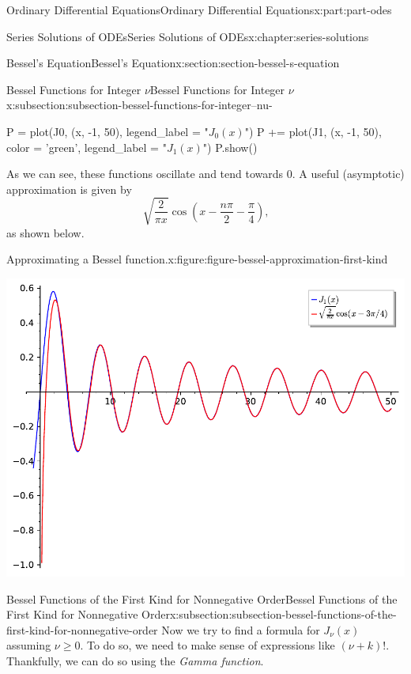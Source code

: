 \documentclass[oneside,10pt,]{book}
\numberwithin{equation}{part}
\begin{document}
\begin{partptx}{Ordinary Differential Equations}{}{Ordinary Differential Equations}{}{}{x:part:part-odes}
\begin{chapterptx}{Series Solutions of ODEs}{}{Series Solutions of ODEs}{}{}{x:chapter:series-solutions}
\begin{sectionptx}{Bessel's Equation}{}{Bessel's Equation}{}{}{x:section:section-bessel-s-equation}
\begin{subsectionptx}{Bessel Functions for Integer \(\nu\)}{}{Bessel Functions for Integer \(\nu\)}{}{}{x:subsection:subsection-bessel-functions-for-integer--nu-}
\begin{sageinput}
P = plot(J0, (x, -1, 50), legend_label = "$J_{0}(x)$")
P += plot(J1, (x, -1, 50), color = 'green', legend_label = "$J_{1}(x)$")
P.show()
\end{sageinput}
As we can see, these functions oscillate and tend towards \(0\). A useful (asymptotic) approximation is given by%
\begin{equation}
\sqrt{\frac{2}{\pi x}}\cos\left(x - \frac{n\pi}{2} - \frac{\pi}{4}\right)\text{,}\label{x:men:equation-bessel-asymptotic}
\end{equation}
as shown below.%
\begin{figureptx}{Approximating a Bessel function.}{x:figure:figure-bessel-approximation-first-kind}{}%
\centering
\tcblower
\end{figureptx}%
\begin{image}{0}{1}{0}%
\includegraphics[width=\linewidth]{generated/sageplot/image-bessel-approximation-first-kind.pdf}%
\end{image}%
\end{subsectionptx}
%
%
\typeout{************************************************}
\typeout{************************************************}
%
\begin{subsectionptx}{Bessel Functions of the First Kind for Nonnegative Order}{}{Bessel Functions of the First Kind for Nonnegative Order}{}{}{x:subsection:subsection-bessel-functions-of-the-first-kind-for-nonnegative-order}
Now we try to find a formula for \(J_{\nu}(x)\) assuming \(\nu\geq0\). To do so, we need to make sense of expressions like \((\nu + k)!\). Thankfully, we can do so using the \emph{Gamma function}.%

\end{subsectionptx}
\end{sectionptx}
\end{chapterptx}
\end{partptx}
\end{document}
